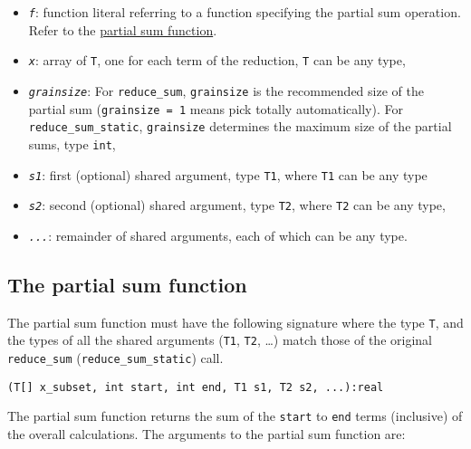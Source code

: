 \documentclass[
  10pt,
]{book}
\providecommand{\tightlist}{%
  \setlength{\itemsep}{0pt}\setlength{\parskip}{0pt}}
\begin{document}
\begin{itemize}
\tightlist
\item
  \emph{\texttt{f}}: function literal referring to a function specifying the
  partial sum operation. Refer to the \protect\hyperlink{functions-partial-sum}{partial sum function}.
\item
  \emph{\texttt{x}}: array of \texttt{T}, one for each term of the reduction, \texttt{T} can be any type,
\item
  \emph{\texttt{grainsize}}: For \texttt{reduce\_sum}, \texttt{grainsize} is the recommended size of the partial sum (\texttt{grainsize\ =\ 1} means pick totally automatically). For \texttt{reduce\_sum\_static}, \texttt{grainsize} determines the maximum size of the partial sums, type \texttt{int},
\item
  \emph{\texttt{s1}}: first (optional) shared argument, type \texttt{T1}, where \texttt{T1} can be any type
\item
  \emph{\texttt{s2}}: second (optional) shared argument, type \texttt{T2}, where \texttt{T2} can be any type,
\item
  \emph{\texttt{...}}: remainder of shared arguments, each of which can be any type.
\end{itemize}

\hypertarget{functions-partial-sum}{%
\subsection{The partial sum function}\label{functions-partial-sum}}

The partial sum function must have the following signature where the type \texttt{T}, and the
types of all the shared arguments (\texttt{T1}, \texttt{T2}, \ldots) match those of the original
\texttt{reduce\_sum} (\texttt{reduce\_sum\_static}) call.

\begin{verbatim}
(T[] x_subset, int start, int end, T1 s1, T2 s2, ...):real
\end{verbatim}

The partial sum function returns the sum of the \texttt{start} to \texttt{end} terms (inclusive) of the overall
calculations. The arguments to the partial sum function are:
\end{document}
